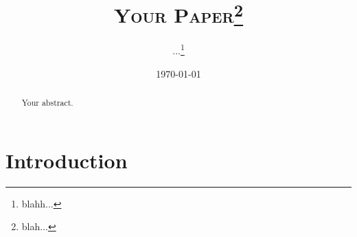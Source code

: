 \documentclass[12pt]{article}
\title{\textsc{Your Paper}\thanks{blah...}}
\author{\textsc{...}\thanks{blahh...}}
\date{\textsc{\today}}
\begin{document}
\maketitle

\begin{abstract}
Your abstract.
\end{abstract}

\section{Introduction}


%
%

\end{document}
